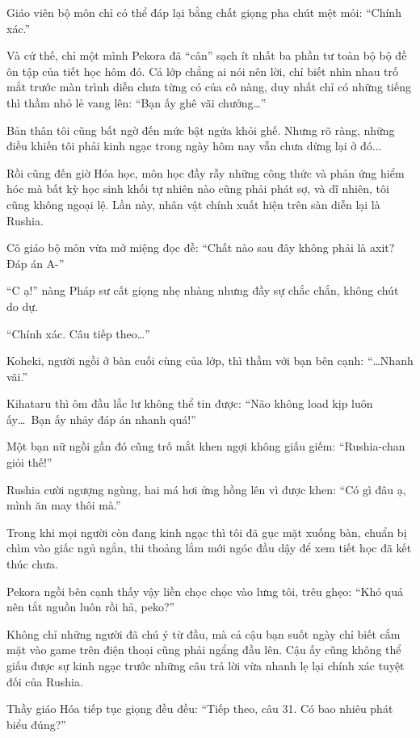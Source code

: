 \documentclass[../main.tex]{subfiles}
\begin{document}
Giáo viên bộ môn chỉ có thể đáp lại bằng chất giọng pha chút mệt mỏi: ``Chính xác.''

Và cứ thế, chỉ một mình Pekora đã ``cân'' sạch ít nhất ba phần tư toàn bộ bộ đề ôn tập của tiết học hôm đó. Cả lớp chẳng ai nói nên lời, chỉ biết nhìn nhau trố mắt trước màn trình diễn chưa từng có của cô nàng, duy nhất chỉ có những tiếng thì thầm nhỏ lẻ vang lên: ``Bạn ấy ghê vãi chưởng\dots''

Bản thân tôi cũng bất ngờ đến mức bật ngửa khỏi ghế. Nhưng rõ ràng, những điều khiến tôi phải kinh ngạc trong ngày hôm nay vẫn chưa dừng lại ở đó...

\ct

Rồi cũng đến giờ Hóa học, môn học đầy rẫy những công thức và phản ứng hiểm hóc mà bất kỳ học sinh khối tự nhiên nào cũng phải phát sợ, và dĩ nhiên, tôi cũng không ngoại lệ. Lần này, nhân vật chính xuất hiện trên sàn diễn lại là Rushia.

Cô giáo bộ môn vừa mở miệng đọc đề: ``Chất nào sau đây không phải là axit? Đáp án A-''

``C ạ!'' nàng Pháp sư cất giọng nhẹ nhàng nhưng đầy sự chắc chắn, không chút do dự.

``Chính xác. Câu tiếp theo\dots''

Koheki, người ngồi ở bàn cuối cùng của lớp, thì thầm với bạn bên cạnh: ``\dots Nhanh vãi.''

Kihataru thì ôm đầu lắc lư không thể tin được: ``Não không load kịp luôn ấy\dots\ Bạn ấy nhảy đáp án nhanh quá!''

Một bạn nữ ngồi gần đó cũng trố mắt khen ngợi không giấu giếm: ``Rushia-chan giỏi thế!''

Rushia cười ngượng ngùng, hai má hơi ửng hồng lên vì được khen: ``Có gì đâu ạ, mình ăn may thôi mà.''

Trong khi mọi người còn đang kinh ngạc thì tôi đã gục mặt xuống bàn, chuẩn bị chìm vào giấc ngủ ngắn, thi thoảng lắm mới ngóc đầu dậy để xem tiết học đã kết thúc chưa.

Pekora ngồi bên cạnh thấy vậy liền chọc chọc vào lưng tôi, trêu ghẹo: ``Khó quá nên tắt nguồn luôn rồi hả, peko?''

Không chỉ những người đã chú ý từ đầu, mà cả cậu bạn suốt ngày chỉ biết cắm mặt vào game trên điện thoại cũng phải ngẩng đầu lên. Cậu ấy cũng không thể giấu được sự kinh ngạc trước những câu trả lời vừa nhanh lẹ lại chính xác tuyệt đối của Rushia.

Thầy giáo Hóa tiếp tục giọng đều đều: ``Tiếp theo, câu 31. Có bao nhiêu phát biểu đúng?''
\end{document}
